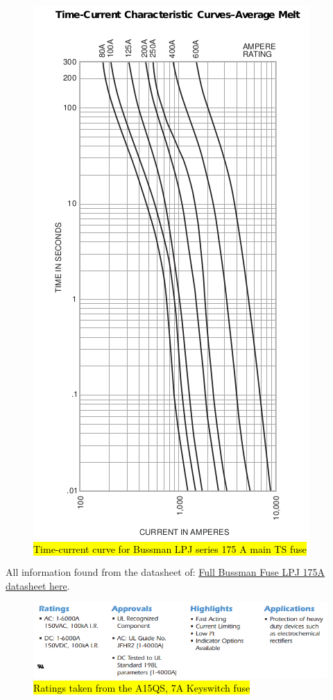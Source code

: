 \documentclass{article}
\DeclareRobustCommand{\hlr}[1]{{\sethlcolor{red}\hl{#1}}}
\begin{document}
\begin{figure}[H]
    \centering
    \includegraphics[width = 0.7 \textwidth]{TSfuseT-Agraph}
    \caption{\hlr{Time-current curve for Bussman LPJ series 175 A main TS fuse}}
    \label{mainTSfusecurve}
\end{figure}

All information found from the datasheet of:
\href{http://www.allfuses.com/media/documents/Bussmann\%20LPJ\%20(70-600A).pdf}{Full Bussman Fuse LPJ 175A datasheet here}.

\begin{figure}[H]
    \centering
    \includegraphics[width = 0.6 \textwidth]{Keyswitchratings}
    \caption{\hlr{Ratings taken from the A15QS, 7A Keyswitch fuse}}
    \label{keyswitchratings}
\end{figure}
\end{document}
